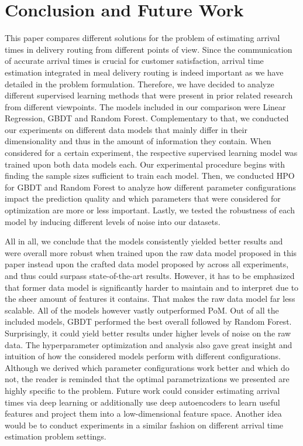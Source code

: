 \chapter{Conclusion and Future Work}\label{chap:conc}
This paper compares different solutions for the problem of estimating arrival times in delivery routing from different points of view. Since the communication of accurate arrival times is crucial for customer satisfaction, arrival time estimation integrated in meal delivery routing is indeed important as we have detailed in the problem formulation. Therefore, we have decided to analyze different supervised learning methods that were present in prior related research from different viewpoints. The models included in our comparison were Linear Regression, GBDT and Random Forest. Complementary to that, we conducted our experiments on different data models that mainly differ in their dimensionality and thus in the amount of information they contain. When considered for a certain experiment, the respective supervised learning model was trained upon both data models each. Our experimental procedure begins with finding the sample sizes sufficient to train each model. Then, we conducted HPO for GBDT and Random Forest to analyze how different parameter configurations impact the prediction quality and which parameters that were considered for optimization are more or less important. Lastly, we tested the robustness of each model by inducing different levels of noise into our datasets.

All in all, we conclude that the models consistently yielded better results and were overall more robust when trained upon the raw data model proposed in this paper instead upon the crafted data model proposed by \cite{Hildebrandt2020_EAT} across all experiments, and thus could surpass state-of-the-art results. However, it has to be emphasized that former data model is significantly harder to maintain and to interpret due to the sheer amount of features it contains. That makes the raw data model far less scalable. All of the models however vastly outperformed PoM. Out of all the included models, GBDT performed the best overall followed by Random Forest.  Surprisingly, it could yield better results under higher levels of noise on the raw data. The hyperparameter optimization and analysis also gave great insight and intuition of how the considered models perform with different configurations. Although we derived which parameter configurations work better and which do not, the reader is reminded that the optimal parametrizations we presented are highly specific to the problem. Future work could consider estimating arrival times via deep learning or additionally use deep autoencoders to learn useful features and project them into a low-dimensional feature space. Another idea would be to conduct experiments in a similar fashion on different arrival time estimation problem settings. 